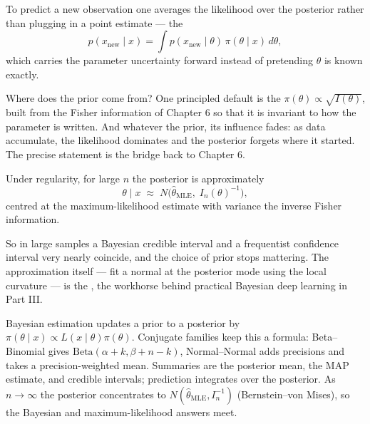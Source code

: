 \documentclass[11pt]{article}
\begin{document}
To predict a new observation one averages the likelihood over the posterior
rather than plugging in a point estimate --- the 
\[
  p(x_{\text{new}}\mid x) = \int p(x_{\text{new}}\mid\theta)\,\pi(\theta\mid x)\,d\theta,
\]
which carries the parameter uncertainty forward instead of pretending
$\theta$ is known exactly.

Where does the prior come from? One principled default is the
 $\pi(\theta)\propto\sqrt{I(\theta)}$, built from the
Fisher information of Chapter 6 so that it is invariant to how the parameter
is written. And whatever the prior, its influence fades: as data accumulate,
the likelihood dominates and the posterior forgets where it started. The
precise statement is the bridge back to Chapter 6.

\begin{theorem}
Under regularity, for large $n$ the posterior is approximately
\[
  \theta \mid x \;\approx\; N\!\big(\hat\theta_{\text{MLE}},\; I_n(\theta)^{-1}\big),
\]
centred at the maximum-likelihood estimate with variance the inverse Fisher
information.
\end{theorem}

\noindent So in large samples a Bayesian credible interval and a frequentist
confidence interval very nearly coincide, and the choice of prior stops
mattering. The approximation itself --- fit a normal at the posterior mode
using the local curvature --- is the , the
workhorse behind practical Bayesian deep learning in Part III.

\begin{summarybox}
Bayesian estimation updates a prior to a posterior by
$\pi(\theta\mid x)\propto L(x\mid\theta)\pi(\theta)$. Conjugate families keep
this a formula: Beta--Binomial gives $\mathrm{Beta}(\alpha+k,\beta+n-k)$,
Normal--Normal adds precisions and takes a precision-weighted mean. Summaries
are the posterior mean, the MAP estimate, and credible intervals; prediction
integrates over the posterior. As $n\to\infty$ the posterior concentrates to
$N(\hat\theta_{\text{MLE}}, I_n^{-1})$ (Bernstein--von Mises), so the Bayesian
and maximum-likelihood answers meet.
\end{summarybox}
\end{document}
